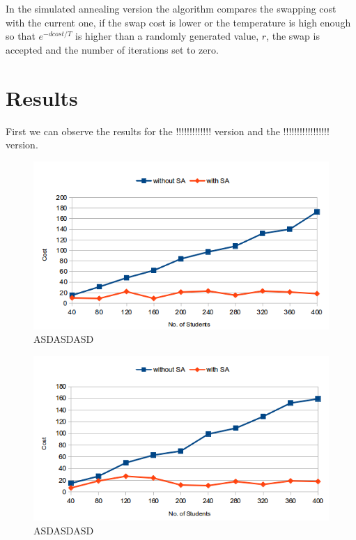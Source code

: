 \documentclass[a4paper,10pt,openright,openbib,twocolumn]{article}
\begin{document}
In the simulated annealing version the algorithm compares the swapping cost with the current one, if the swap cost is lower or the temperature is high enough so that $e^{-dcost/T}$ is higher than a randomly generated value, $r$, the swap is accepted and the number of iterations set to zero.    

\section{Results}

First we can observe the results for the !!!!!!!!!!!!! version and the !!!!!!!!!!!!!!!!! version.
\begin{figure}[!htb]
    \centering
    \begin{minipage}[t]{\columnwidth}
        \includegraphics[width=\textwidth]{./img/rand-1.png}
        \caption{ASDASDASD\label{fig:parallel}}
    \end{minipage}
\end{figure}


\begin{figure}[!htb]
    \centering
    \begin{minipage}[t]{\columnwidth}
        \includegraphics[width=\textwidth]{./img/arc4-1.png}
        \caption{ASDASDASD\label{fig:parallel}}
    \end{minipage}
\end{figure}
\end{document}
